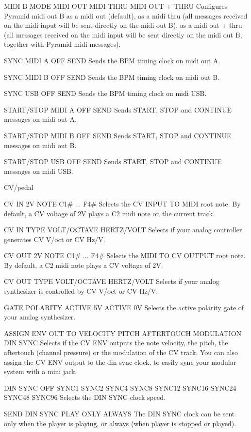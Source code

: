  MIDI B MODE   MIDI OUT   MIDI THRU   MIDI OUT + THRU 
Configures Pyramid midi out B as a midi out (default), as a midi thru (all messages received on the midi input will be sent directly on the midi out B), as a midi out + thru (all messages received on the midi input will be sent directly on the midi out B, together with Pyramid midi messages). 

 SYNC MIDI A   OFF   SEND 
Sends the BPM timing clock on midi out A.

 SYNC MIDI B   OFF   SEND 
Sends the BPM timing clock on midi out B. 

 SYNC USB   OFF   SEND 
Sends the BPM timing clock on midi USB.

 START/STOP MIDI A   OFF   SEND 
Sends START, STOP and CONTINUE messages on midi out A.

 START/STOP MIDI B   OFF   SEND 
Sends START, STOP and CONTINUE messages on midi out B. 

 START/STOP USB   OFF   SEND 
Sends START, STOP and CONTINUE messages on midi USB.

CV/pedal

 CV IN 2V NOTE   C1#   ...   F4# 
Selects the CV INPUT TO MIDI root note. By default, a CV voltage of 2V plays a C2 midi note on the current track. 

 CV IN TYPE   VOLT/OCTAVE   HERTZ/VOLT 
Selects if your analog controller generates CV V/oct or CV Hz/V. 

 CV OUT 2V NOTE   C1#   ...   F4# 
Selects the MIDI TO CV OUTPUT root note. By default, a C2 midi note plays a CV voltage of 2V. 

 CV OUT TYPE   VOLT/OCTAVE   HERTZ/VOLT 
Selects if your analog synthesizer is controlled by CV V/oct or CV Hz/V. 

 GATE POLARITY   ACTIVE 5V   ACTIVE 0V 
Selects the active polarity gate of your analog synthesizer. 

 ASSIGN ENV OUT TO   VELOCITY   PITCH   AFTERTOUCH   MODULATION   DIN SYNC 
Selects if the CV ENV outputs the note velocity, the pitch, the aftertouch (channel pressure) or the modulation of the CV track. You can also assign the CV ENV output to the din sync clock, to easily sync your modular system with a mini jack.

 DIN SYNC   OFF   SYNC1   SYNC2   SYNC4   SYNC8   SYNC12   SYNC16   SYNC24   SYNC48   SYNC96 
Selects the DIN SYNC clock speed.

 SEND DIN SYNC   PLAY ONLY   ALWAYS 
The DIN SYNC clock can be sent only when the player is playing, or always (when player is stopped or played).

